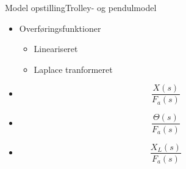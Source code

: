 \begin{frame}{Model opstilling}{Trolley- og pendulmodel}
    \begin{itemize}
      	\item<1-> Overføringsfunktioner 
      	\begin{itemize}
      		\item<2-> Lineariseret 
      		\item<2-> Laplace tranformeret  
      	\end{itemize}	       
    \end{itemize}  
\bigskip
\bigskip             
  \begin{minipage}[t]{0.3\linewidth} 
    \begin{itemize}            
	\item<3->[] {\begin{equation*}
             		\frac{X(s)}{F_a(s)}   
                \end{equation*}}	
    \end{itemize}           
  \end{minipage}
  \begin{minipage}[t]{0.3\linewidth} 
    \begin{itemize}            
	\item<4->[] {\begin{equation*}
             		\frac{\Theta(s)}{F_a(s)} 
                \end{equation*}}	
    \end{itemize}           
  \end{minipage}
  \begin{minipage}[t]{0.3\linewidth} 
    \begin{itemize}            
	\item<5->[] {\begin{equation*}
             		\frac{X_L(s)}{F_a(s)}  
                \end{equation*}}	
    \end{itemize}           
  \end{minipage}


\end{frame}
